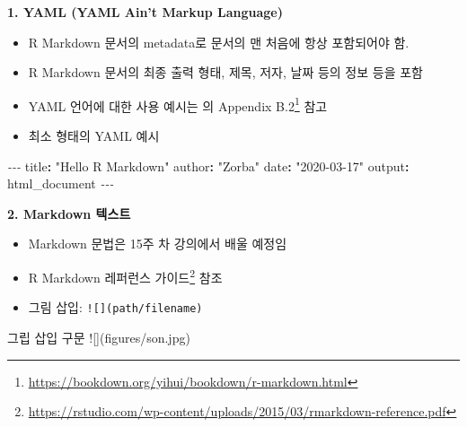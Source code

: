 \documentclass[
  11pt,
]{krantz}
\newenvironment{Shaded}{\begin{snugshade}}{\end{snugshade}}
\newcommand{\AlertTok}[1]{\textcolor[rgb]{0.33,0.33,0.33}{#1}}
\newcommand{\AttributeTok}[1]{\textcolor[rgb]{0.61,0.61,0.61}{#1}}
\newcommand{\FunctionTok}[1]{\textcolor[rgb]{0,0,0}{#1}}
\newcommand{\KeywordTok}[1]{\textcolor[rgb]{0.27,0.27,0.27}{\textbf{#1}}}
\newcommand{\NormalTok}[1]{#1}
\newcommand{\PreprocessorTok}[1]{\textcolor[rgb]{0.37,0.37,0.37}{\textit{#1}}}
\newcommand{\StringTok}[1]{\textcolor[rgb]{0.5,0.5,0.5}{#1}}
\providecommand{\tightlist}{%
  \setlength{\itemsep}{0pt}\setlength{\parskip}{0pt}}
\renewcommand{\href}[2]{#2\footnote{\url{#1}}}
\begin{document}
\normalsize

\textbf{1. YAML (YAML Ain't Markup Language)}

\begin{itemize}
\tightlist
\item
  R Markdown 문서의 metadata로 문서의 맨 처음에 항상 포함되어야 함.
\item
  R Markdown 문서의 최종 출력 형태, 제목, 저자, 날짜 등의 정보 등을 포함
\item
  YAML 언어에 대한 사용 예시는 \citet{xie-2016} 의 \href{https://bookdown.org/yihui/bookdown/r-markdown.html}{Appendix B.2} 참고
\item
  최소 형태의 YAML 예시
\end{itemize}

\footnotesize

\begin{Shaded}
\begin{Highlighting}[]
\PreprocessorTok{{-}{-}{-}}
\FunctionTok{title}\KeywordTok{:}\AttributeTok{ }\StringTok{"Hello R Markdown"}
\FunctionTok{author}\KeywordTok{:}\AttributeTok{ }\StringTok{"Zorba"}
\FunctionTok{date}\KeywordTok{:}\AttributeTok{ }\StringTok{"2020{-}03{-}17"}
\FunctionTok{output}\KeywordTok{:}\AttributeTok{ html\_document}
\PreprocessorTok{{-}{-}{-}}
\end{Highlighting}
\end{Shaded}

\normalsize

\textbf{2. Markdown 텍스트}

\begin{itemize}
\tightlist
\item
  Markdown 문법은 15주 차 강의에서 배울 예정임
\item
  \href{https://rstudio.com/wp-content/uploads/2015/03/rmarkdown-reference.pdf}{R Markdown 레퍼런스 가이드} 참조
\item
  그림 삽입: \texttt{!{[}{]}(path/filename)}
\end{itemize}

\begin{Shaded}
\begin{Highlighting}[]
\NormalTok{그립 삽입 구문}
\AlertTok{![](figures/son.jpg)}   
\end{Highlighting}
\end{Shaded}
\end{document}
